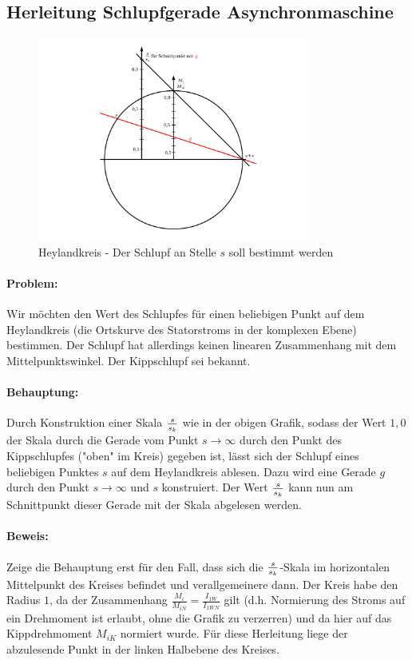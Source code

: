 \documentclass[11pt]{article}
\begin{document}
\subsection{Herleitung Schlupfgerade Asynchronmaschine} \label{ssec:appendix_asm_slip}
\begin{figure}[h]
	\centering
	\includegraphics[width=0.8\textwidth]{img/asynchronmaschine_schlupfgerade_verschoben.pdf}
	\caption*{Heylandkreis - Der Schlupf an Stelle $s$ soll bestimmt werden}
\end{figure}

\paragraph{Problem:} Wir möchten den Wert des Schlupfes für einen beliebigen Punkt auf dem Heylandkreis (die Ortskurve des Statorstroms in der komplexen Ebene) bestimmen. Der Schlupf hat allerdings keinen linearen Zusammenhang mit dem Mittelpunktswinkel. Der Kippschlupf sei bekannt.

\paragraph{Behauptung:} Durch Konstruktion einer Skala $s \over s_k$ wie in der obigen Grafik, sodass der Wert $1,0$ der Skala durch die Gerade vom Punkt $s \to \infty$ durch den Punkt des Kippschlupfes ("oben" im Kreis) gegeben ist, lässt sich der Schlupf eines beliebigen Punktes $s$ auf dem Heylandkreis ablesen. Dazu wird eine Gerade $g$ durch den Punkt $s \to \infty$ und $s$ konstruiert. Der Wert $s \over s_k$ kann nun am Schnittpunkt dieser Gerade mit der Skala abgelesen werden.

\paragraph{Beweis: } Zeige die Behauptung erst für den Fall, dass sich die $s \over s_k$-Skala im horizontalen Mittelpunkt des Kreises befindet und verallgemeinere dann. Der Kreis habe den Radius $1$, da der Zusammenhang $\frac{M_i}{M_{iN}} = \frac{I_{1W}}{I_{1WN}}$ gilt (d.h. Normierung des Stroms auf ein Drehmoment ist erlaubt, ohne die Grafik zu verzerren) und da hier auf das Kippdrehmoment $M_{iK}$ normiert wurde. Für diese Herleitung liege der abzulesende Punkt in der linken Halbebene des Kreises.
\end{document}
